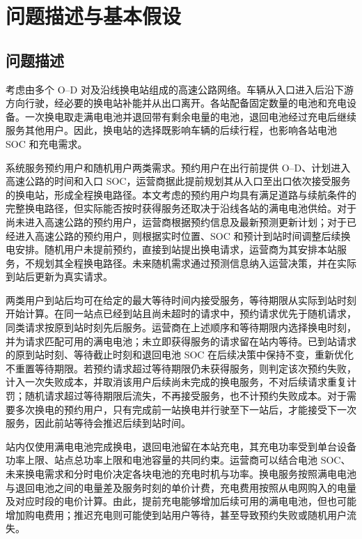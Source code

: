 \section{问题描述与基本假设}

\subsection{问题描述}
考虑由多个 O--D 对及沿线换电站组成的高速公路网络。车辆从入口进入后沿下游方向行驶，经必要的换电站补能并从出口离开。各站配备固定数量的电池和充电设备。一次换电取走满电电池并退回带有剩余电量的电池，退回电池经过充电后继续服务其他用户。因此，换电站的选择既影响车辆的后续行程，也影响各站电池 SOC 和充电需求。

系统服务预约用户和随机用户两类需求。预约用户在出行前提供 O--D、计划进入高速公路的时间和入口 SOC，运营商据此提前规划其从入口至出口依次接受服务的换电站，形成全程换电路径。本文考虑的预约用户均具有满足道路与续航条件的完整换电路径，但实际能否按时获得服务还取决于沿线各站的满电电池供给。对于尚未进入高速公路的预约用户，运营商根据预约信息及最新预测更新计划；对于已经进入高速公路的预约用户，则根据实时位置、SOC 和预计到站时间调整后续换电安排。随机用户未提前预约，直接到站提出换电请求，运营商为其安排本站服务，不规划其全程换电路径。未来随机需求通过预测信息纳入运营决策，并在实际到站后更新为真实请求。

两类用户到站后均可在给定的最大等待时间内接受服务，等待期限从实际到站时刻开始计算。在同一站点已经到站且尚未超时的请求中，预约请求优先于随机请求，同类请求按原到站时刻先后服务。运营商在上述顺序和等待期限内选择换电时刻，并为请求匹配可用的满电电池；未立即获得服务的请求留在站内等待。已到站请求的原到站时刻、等待截止时刻和退回电池 SOC 在后续决策中保持不变，重新优化不重置等待期限。若预约请求超过等待期限仍未获得服务，则判定该次预约失败，计入一次失败成本，并取消该用户后续尚未完成的换电服务，不对后续请求重复计罚；随机请求超过等待期限后流失，不再接受服务，也不计预约失败成本。对于需要多次换电的预约用户，只有完成前一站换电并行驶至下一站后，才能接受下一次服务，因此前站等待会推迟后续到站时间。

站内仅使用满电电池完成换电，退回电池留在本站充电，其充电功率受到单台设备功率上限、站点总功率上限和电池容量的共同约束。运营商可以结合电池 SOC、未来换电需求和分时电价决定各块电池的充电时机与功率。换电服务按照满电电池与退回电池之间的电量差及服务时刻的单价计费，充电费用按照从电网购入的电量及对应时段的电价计算。由此，提前充电能够增加后续可用的满电电池，但也可能增加购电费用；推迟充电则可能使到站用户等待，甚至导致预约失败或随机用户流失。

